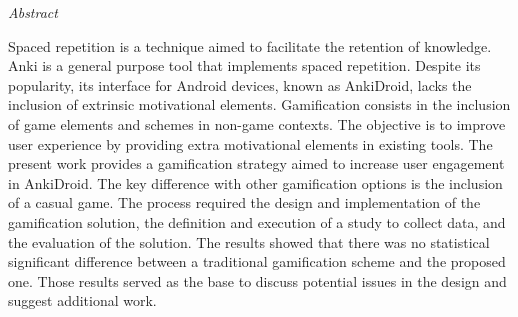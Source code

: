 \documentclass[11pt, oneside]{Thesis} %
\begin{document}
 {\huge{\textit{Abstract}} \par}{

Spaced repetition is a technique aimed to facilitate the retention of knowledge. Anki is a general purpose tool that implements spaced repetition. Despite its popularity, its interface for Android devices, known as AnkiDroid, lacks the inclusion of extrinsic motivational elements. Gamification consists in the inclusion of game elements and schemes in non-game contexts. The objective is to improve user experience by providing extra motivational elements in existing tools. The present work provides a gamification strategy aimed to increase user engagement in AnkiDroid. The key difference with other gamification options is the inclusion of a casual game. The process required the design and implementation of the gamification solution, the definition and execution of a study to collect data, and the evaluation of the solution. The results showed that there was no statistical significant difference between a traditional gamification scheme and the proposed one. Those results served as the base to discuss potential issues in the design and suggest additional work.

%

\clearpage %



\clearpage %


\pagestyle{fancy} %

\tableofcontents %

}
\end{document}
